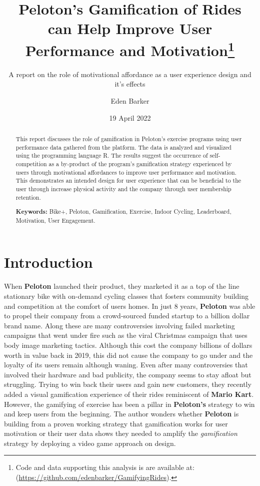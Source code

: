 \documentclass[
]{article}
\title{Peloton's Gamification of Rides can Help Improve User Performance and Motivation\thanks{Code and data supporting this analysis is are available at: (\url{https://github.com/edenbarker/GamifyingRides}).}}
\subtitle{A report on the role of motivational affordance as a user experience design and it's effects}
\author{Eden Barker}
\date{19 April 2022}
\begin{document}
\maketitle
\begin{abstract}
This report discusses the role of gamification in Peloton's exercise programs using user performance data gathered from the platform. The data is analyzed and visualized using the programming language R. The results suggest the occurrence of self-competition as a by-product of the program's gamification strategy experienced by users through motivational affordances to improve user performance and motivation. This demonstrates an intended design for user experience that can be beneficial to the user through increase physical activity and the company through user membership retention.

\par

\textbf{Keywords:} Bike+, Peloton, Gamification, Exercise, Indoor Cycling, Leaderboard, Motivation, User Engagement.
\end{abstract}

{
\setcounter{tocdepth}{2}
\tableofcontents
}
\hypertarget{introduction}{%
\section{Introduction}\label{introduction}}

When \textbf{Peloton} launched their product, they marketed it as a top of the line stationary bike with on-demand cycling classes that fosters community building and competition at the comfort of users homes. In just 8 years, \textbf{Peloton} was able to propel their company from a crowd-sourced funded startup to a billion dollar brand name. Along these are many controversies involving failed marketing campaigns that went under fire such as the viral Christmas campaign that uses body image marketing tactics. Although this cost the company billions of dollars worth in value back in 2019, this did not cause the company to go under and the loyalty of its users remain although waning. Even after many controversies that involved their hardware and bad publicity, the company seems to stay afloat but struggling. Trying to win back their users and gain new customers, they recently added a visual gamification experience of their rides reminiscent of \textbf{Mario Kart}. However, the gamifying of exercise has been a pillar in \textbf{Peloton's} strategy to win and keep users from the beginning. The author wonders whether \textbf{Peloton} is building from a proven working strategy that gamification works for user motivation or their user data shows they needed to amplify the \emph{gamification} strategy by deploying a video game approach on design.
\end{document}
